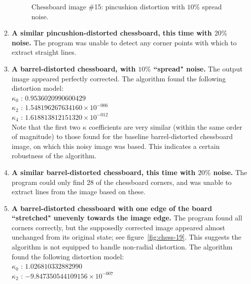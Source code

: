 \begin{enumerate}
\begin{figure}[H]
  \caption{Chessboard image \#15: pincushion distortion with $10\%$ spread noise.}
  \label{fig:chess-15}
\end{figure}
  \item \textbf{A similar pincushion-distorted chessboard, this time with $20\%$ noise.} The program was unable to detect any corner points with which to extract straight lines.
  \item \textbf{A barrel-distorted chessboard, with $10\%$ ``spread" noise.} The output image appeared perfectly corrected. The algorithm found the following distortion model:\\
   $ \kappa_{0}$ : $0.9536020990600429$\\
   $ \kappa_{2}$ : $1.548196267634160 \times 10^{-006}$\\
   $ \kappa_{4}$ : $1.618813812151320 \times 10^{-012}$\\
   Note that the first two $\kappa$ coefficients are very similar (within the same order of magnitude) to those found for the baseline barrel-distorted chessboard image, on which this noisy image was based. This indicates a certain robustness of the algorithm.
  \item \textbf{A similar barrel-distorted chessboard, this time with $20\%$ noise.} The program could only find 28 of the chessboard corners, and was unable to extract lines from the image based on these.
  \item \textbf{A barrel-distorted chessboard with one edge of the board ``stretched" unevenly towards the image edge.} The program found all corners correctly, but the supposedly corrected image appeared almost unchanged from its original state; see figure~\ref{fig:chess-19}. This suggests the algorithm is not equipped to handle non-radial distortion. The algorithm found the following distortion model:\\
   $ \kappa_{0}$ : $1.026810332882990$\\
   $ \kappa_{2}$ : $-9.847350544109156 \times 10^{-007}$\\

\end{enumerate}
